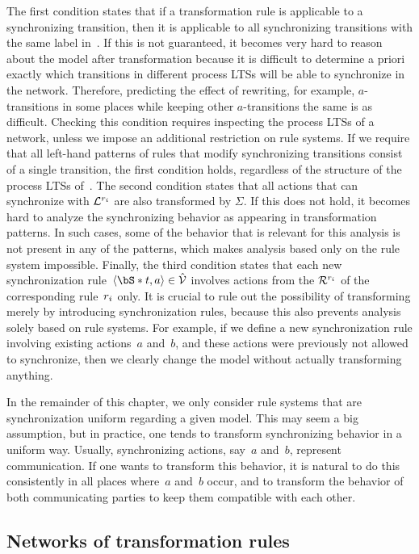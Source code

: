 The first condition states that if a transformation rule is applicable to a synchronizing transition, then it is applicable to all synchronizing transitions with the same label in~\smodel.
If this is not guaranteed, it becomes very hard to reason about the model after transformation because it is difficult to determine a priori exactly which transitions in different process LTSs will be able to synchronize in the network.
Therefore, predicting the effect of rewriting, for example, $a$-transitions in some places while keeping other $a$-transitions the same is as difficult.
Checking this condition requires inspecting the process LTSs of a network, unless we impose an additional restriction on rule systems.
If we require that all left-hand patterns of rules that modify synchronizing transitions consist of a single transition, the first condition holds, regardless of the structure of the process LTSs of~\smodel.
The second condition states that all actions that can synchronize with $\mathcal{L}^{{r_i}}$ are also transformed by $\Sigma$.
If this does not hold, it becomes hard to analyze the synchronizing behavior as appearing in transformation patterns.
In such cases, some of the behavior that is relevant for this analysis is not present in any of the patterns, which makes analysis based only on the rule system impossible.
Finally, the third condition states that each new synchronization rule~$\langle\vectornot{t},a\rangle \in \hat\synchrules$ involves actions from the $\mathcal{R}^{{r_i}}$ of the corresponding rule~${r_i}$ only.
It is crucial to rule out the possibility of transforming merely by introducing synchronization rules, because this also prevents analysis solely based on rule systems.
For example, if we define a new synchronization rule involving existing actions~$a$ and~$b$, and these actions were previously not allowed to synchronize, then we clearly change the model without actually transforming anything.

In the remainder of this chapter, we only consider rule systems that are synchronization uniform regarding a given model.
This may seem a big assumption, but in practice, one tends to transform synchronizing behavior in a uniform way.
Usually, synchronizing actions, say~$a$ and~$b$, represent communication.
If one wants to transform this behavior, it is natural to do this consistently in all places where~$a$ and~$b$ occur, and to transform the behavior of both communicating parties to keep them compatible with each other.

\subsection{Networks of transformation rules}

